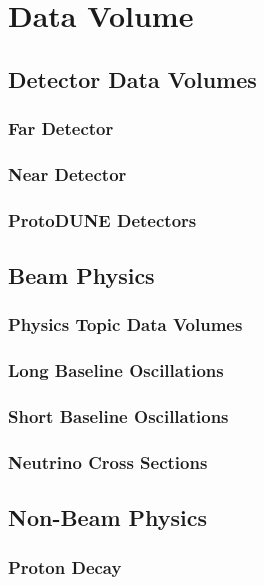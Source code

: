 %
\chapter{Data Volume } 
\section{Detector Data Volumes}
\subsection{Far Detector}
\subsection{Near Detector}
\subsection{ProtoDUNE Detectors}

\section{Beam Physics}
\subsection{Physics Topic Data Volumes}
\subsection{Long Baseline Oscillations}
\subsection{Short Baseline Oscillations}
\subsection{Neutrino Cross Sections}

\section{Non-Beam Physics}
\subsection{Proton Decay}
